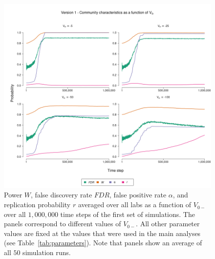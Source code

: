 \documentclass[meta, authordate,issue]{jote-new-article}
\begin{document}
%
%
\begin{figure}
  \begin{fullwidth}
    \centering
    \includegraphics[width=\textwidth]{v1_cha_plot_vnm.png}
    \caption{Power $W$, false discovery rate $FDR$, false positive rate $\alpha$, and replication probability $r$ averaged over all labs as a function of $V_{0-}$ over all $1,000,000$ time steps of the first set of simulations. The panels correspond to different values of $V_{0-}$. All other parameter values are fixed at the values that were used in the main analyses (see Table~\ref{tab:parameters}). Note that panels show an average of all $50$ simulation runs.}
    \label{fig:v1_cha_plot_vnm}
  \end{fullwidth}
\end{figure}
%
\end{document}
